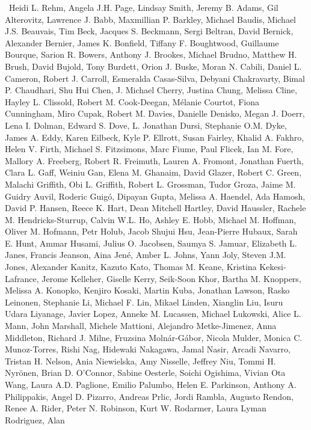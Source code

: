 \begin{thebibliography}{9}
~Heidi L. Rehm, Angela J.H. Page, Lindsay Smith, Jeremy B.
Adams, Gil Alterovitz, Lawrence J. Babb, Maxmillian P. Barkley, Michael
Baudis, Michael J.S. Beauvais, Tim Beck, Jacques S. Beckmann, Sergi
Beltran, David Bernick, Alexander Bernier, James K. Bonfield, Tiffany F.
Boughtwood, Guillaume Bourque, Sarion R. Bowers, Anthony J. Brookes,
Michael Brudno, Matthew H. Brush, David Bujold, Tony Burdett, Orion J.
Buske, Moran N. Cabili, Daniel L. Cameron, Robert J. Carroll, Esmeralda
Casas-Silva, Debyani Chakravarty, Bimal P. Chaudhari, Shu Hui Chen, J.
Michael Cherry, Justina Chung, Melissa Cline, Hayley L. Clissold, Robert
M. Cook-Deegan, Mélanie Courtot, Fiona Cunningham, Miro Cupak, Robert M.
Davies, Danielle Denisko, Megan J. Doerr, Lena I. Dolman, Edward S.
Dove, L. Jonathan Dursi, Stephanie O.M. Dyke, James A. Eddy, Karen
Eilbeck, Kyle P. Ellrott, Susan Fairley, Khalid A. Fakhro, Helen V.
Firth, Michael S. Fitzsimons, Marc Fiume, Paul Flicek, Ian M. Fore,
Mallory A. Freeberg, Robert R. Freimuth, Lauren A. Fromont, Jonathan
Fuerth, Clara L. Gaff, Weiniu Gan, Elena M. Ghanaim, David Glazer,
Robert C. Green, Malachi Griffith, Obi L. Griffith, Robert L. Grossman,
Tudor Groza, Jaime M. Guidry Auvil, Roderic Guigó, Dipayan Gupta,
Melissa A. Haendel, Ada Hamosh, David P. Hansen, Reece K. Hart, Dean
Mitchell Hartley, David Haussler, Rachele M. Hendricks-Sturrup, Calvin
W.L. Ho, Ashley E. Hobb, Michael M. Hoffman, Oliver M. Hofmann, Petr
Holub, Jacob Shujui Hsu, Jean-Pierre Hubaux, Sarah E. Hunt, Ammar
Husami, Julius O. Jacobsen, Saumya S. Jamuar, Elizabeth L. Janes,
Francis Jeanson, Aina Jené, Amber L. Johns, Yann Joly, Steven J.M.
Jones, Alexander Kanitz, Kazuto Kato, Thomas M. Keane, Kristina
Kekesi-Lafrance, Jerome Kelleher, Giselle Kerry, Seik-Soon Khor, Bartha
M. Knoppers, Melissa A. Konopko, Kenjiro Kosaki, Martin Kuba, Jonathan
Lawson, Rasko Leinonen, Stephanie Li, Michael F. Lin, Mikael Linden,
Xianglin Liu, Isuru Udara Liyanage, Javier Lopez, Anneke M. Lucassen,
Michael Lukowski, Alice L. Mann, John Marshall, Michele Mattioni,
Alejandro Metke-Jimenez, Anna Middleton, Richard J. Milne, Fruzsina
Molnár-Gábor, Nicola Mulder, Monica C. Munoz-Torres, Rishi Nag, Hidewaki
Nakagawa, Jamal Nasir, Arcadi Navarro, Tristan H. Nelson, Ania
Niewielska, Amy Nisselle, Jeffrey Niu, Tommi H. Nyrönen, Brian D.
O'Connor, Sabine Oesterle, Soichi Ogishima, Vivian Ota Wang, Laura A.D.
Paglione, Emilio Palumbo, Helen E. Parkinson, Anthony A. Philippakis,
Angel D. Pizarro, Andreas Prlic, Jordi Rambla, Augusto Rendon, Renee A.
Rider, Peter N. Robinson, Kurt W. Rodarmer, Laura Lyman Rodriguez, Alan

\end{thebibliography}
